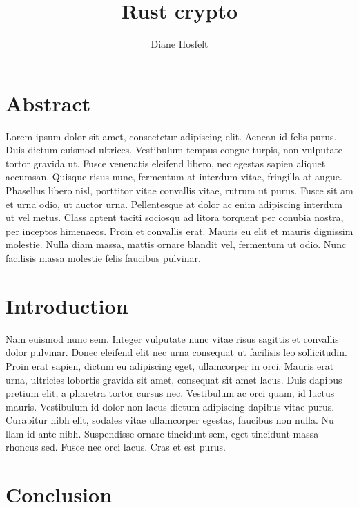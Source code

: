 \documentclass[twocolumn]{article}
\title{Rust crypto}
\author{Diane Hosfelt}
\begin{document}
\maketitle


\section*{Abstract}
Lorem ipsum dolor sit amet, consectetur adipiscing elit. Aenean id felis purus. Duis dictum euismod ultrices. Vestibulum tempus congue turpis, non vulputate tortor gravida ut. Fusce venenatis eleifend libero, nec egestas sapien aliquet accumsan. Quisque risus nunc, fermentum at interdum vitae, fringilla at augue. Phasellus libero nisl, porttitor vitae convallis vitae, rutrum ut purus. Fusce sit am
et urna odio, ut auctor urna. Pellentesque at dolor ac enim adipiscing interdum
ut vel metus. Class aptent taciti sociosqu ad litora torquent per conubia nostra, per inceptos himenaeos. Proin et convallis erat. Mauris eu elit et mauris dignissim molestie. Nulla diam massa, mattis ornare blandit vel, fermentum ut odio. Nunc facilisis massa molestie felis faucibus pulvinar.

\audiencesec
{}\stop

\section{Introduction}
Nam euismod nunc sem. Integer vulputate nunc vitae risus sagittis et convallis dolor pulvinar. Donec eleifend elit nec urna consequat ut facilisis leo sollicitudin. Proin erat sapien, dictum eu adipiscing eget, ullamcorper in orci. Mauris erat urna, ultricies lobortis gravida sit amet, consequat sit amet lacus. Duis dapibus pretium elit, a pharetra tortor cursus nec. Vestibulum ac orci quam, id luctus mauris. Vestibulum id dolor non lacus dictum adipiscing dapibus vitae purus. Curabitur nibh elit, sodales vitae ullamcorper egestas, faucibus non nulla. Nu
llam id ante nibh. Suspendisse ornare tincidunt sem, eget tincidunt massa rhoncus sed. Fusce nec orci lacus. Cras et est purus.

\section{Conclusion}

\participation
\biosec


\end{document}
